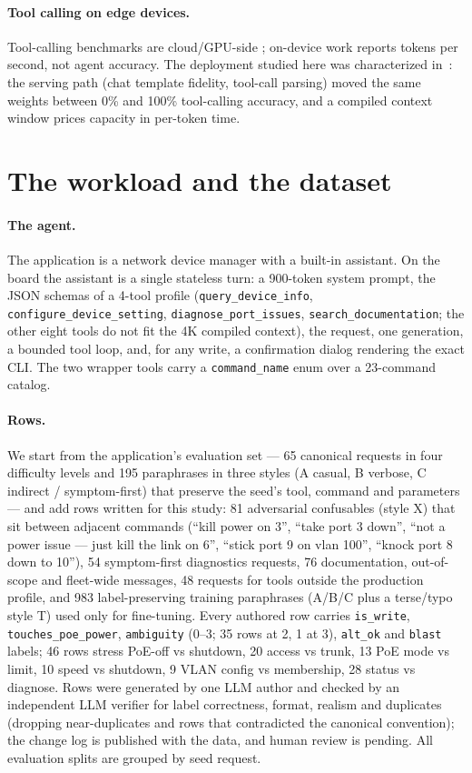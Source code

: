 \documentclass[11pt]{article}
\begin{document}
\paragraph{Tool calling on edge devices.} Tool-calling benchmarks are cloud/GPU-side
\cite{bfcl}; on-device work reports tokens per second, not agent accuracy. The deployment
studied here was characterized in~\cite{lancefindings}: the serving path (chat template
fidelity, tool-call parsing) moved the same weights between 0\% and 100\% tool-calling accuracy,
and a compiled context window prices capacity in per-token time.

\section{The workload and the dataset}
\label{sec:data}

\paragraph{The agent.} The application is a network device manager with a built-in assistant.
On the board the assistant is a single stateless turn: a 900-token system prompt, the JSON
schemas of a 4-tool profile (\texttt{query\_device\_info},\allowbreak{} \texttt{configure\_device\_setting},\allowbreak{}
\texttt{diagnose\_port\_issues},\allowbreak{} \texttt{search\_documentation}; the other eight tools do not fit
the 4K compiled context), the request, one generation, a bounded tool loop, and, for any write,
a confirmation dialog rendering the exact CLI. The two wrapper tools carry a \texttt{command\_name}
enum over a 23-command catalog.

\paragraph{Rows.} We start from the application's evaluation set --- 65 canonical requests in
four difficulty levels and 195 paraphrases in three styles (A casual, B verbose, C indirect /
symptom-first) that preserve the seed's tool, command and parameters --- and add rows written
for this study: 81 adversarial confusables (style X) that sit between adjacent commands
(``kill power on 3'', ``take port 3 down'', ``not a power issue --- just kill the link on 6'',
``stick port 9 on vlan 100'', ``knock port 8 down to 10''), 54 symptom-first diagnostics
requests, 76 documentation, out-of-scope and fleet-wide messages, 48 requests for tools outside
the production profile, and 983 label-preserving training paraphrases (A/B/C plus a terse/typo
style T) used only for fine-tuning. Every authored row carries \texttt{is\_write},
\texttt{touches\_poe\_power}, \texttt{ambiguity} (0--3; 35 rows at 2, 1 at 3), \texttt{alt\_ok}
and \texttt{blast} labels; 46 rows stress PoE-off vs shutdown, 20 access vs trunk, 13 PoE mode vs
limit, 10 speed vs shutdown, 9 VLAN config vs membership, 28 status vs diagnose. Rows were
generated by one LLM author and checked by an independent LLM verifier for label correctness,
format, realism and duplicates (dropping near-duplicates and rows that contradicted the canonical
convention); the change log is published with the data, and human review is pending. All
evaluation splits are grouped by seed request.
\end{document}
